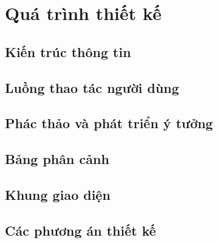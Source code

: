 \section{Quá trình thiết kế}

\subsection{Kiến trúc thông tin}

\subsection{Luồng thao tác người dùng}

\subsection{Phác thảo và phát triển ý tưởng}

\subsection{Bảng phân cảnh}

\subsection{Khung giao diện}

\subsection{Các phương án thiết kế}

